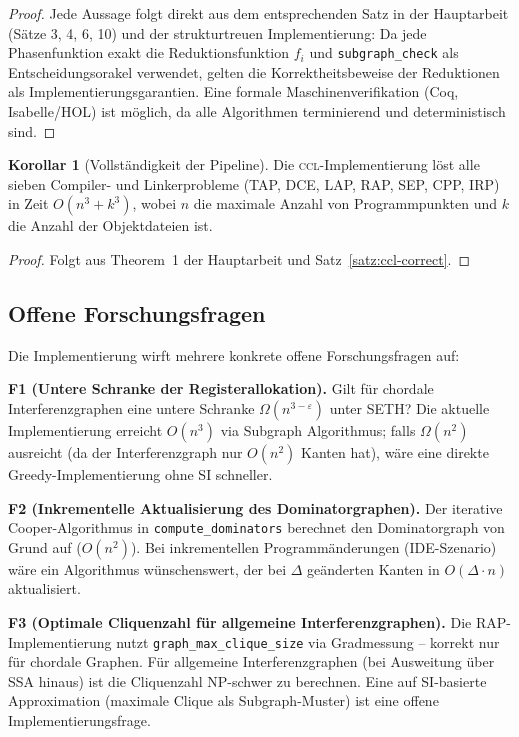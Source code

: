 ﻿\documentclass[a4paper,12pt]{article}
\theoremstyle{definition}
\newtheorem{korollar}{Korollar}
\begin{document}
\begin{proof}
	Jede Aussage folgt direkt aus dem entsprechenden Satz in der Hauptarbeit
	(Sätze 3, 4, 6, 10) und der strukturtreuen Implementierung: Da jede
	Phasenfunktion exakt die Reduktionsfunktion $f_i$ und
	\texttt{subgraph\_check} als Entscheidungsorakel verwendet, gelten die
	Korrektheitsbeweise der Reduktionen als Implementierungsgarantien.
	Eine formale Maschinenverifikation (Coq, Isabelle/HOL) ist möglich,
	da alle Algorithmen terminierend und deterministisch sind.
\end{proof}

\begin{korollar}[Vollständigkeit der Pipeline]
	\label{kor:vollst}
	Die \textsc{ccl}-Implementierung löst alle sieben Compiler- und
	Linkerprobleme (TAP, DCE, LAP, RAP, SEP, CPP, IRP) in Zeit
	$O(n^3 + k^3)$, wobei $n$ die maximale Anzahl von Programmpunkten
	und $k$ die Anzahl der Objektdateien ist.
\end{korollar}

\begin{proof}
	Folgt aus Theorem~1 der Hauptarbeit und Satz~\ref{satz:ccl-correct}.
\end{proof}

\subsection{Offene Forschungsfragen}
\label{sec:ausblick-offen}

Die Implementierung wirft mehrere konkrete offene Forschungsfragen auf:

\textbf{F1 (Untere Schranke der Registerallokation).}
Gilt für chordale Interferenzgraphen eine untere Schranke
$\Omega(n^{3-\varepsilon})$ unter SETH? Die aktuelle Implementierung
erreicht $O(n^3)$ via Subgraph Algorithmus; falls $\Omega(n^2)$
ausreicht (da der Interferenzgraph nur $O(n^2)$ Kanten hat), wäre
eine direkte Greedy-Implementierung ohne SI schneller.

\textbf{F2 (Inkrementelle Aktualisierung des Dominatorgraphen).}
Der iterative Cooper-Algorithmus in \texttt{compute\_dominators}
berechnet den Dominatorgraph von Grund auf ($O(n^2)$). Bei
inkrementellen Programmänderungen (IDE-Szenario) wäre ein
Algorithmus wünschenswert, der bei $\Delta$ geänderten Kanten
in $O(\Delta \cdot n)$ aktualisiert.

\textbf{F3 (Optimale Cliquenzahl für allgemeine Interferenzgraphen).}
Die RAP-Implementierung nutzt \texttt{graph\_max\_clique\_size}
via Gradmessung -- korrekt nur für chordale Graphen. Für
allgemeine Interferenzgraphen (bei Ausweitung über SSA hinaus)
ist die Cliquenzahl NP-schwer zu berechnen. Eine auf SI-basierte
Approximation (maximale Clique als Subgraph-Muster) ist eine
offene Implementierungsfrage.
\end{document}
